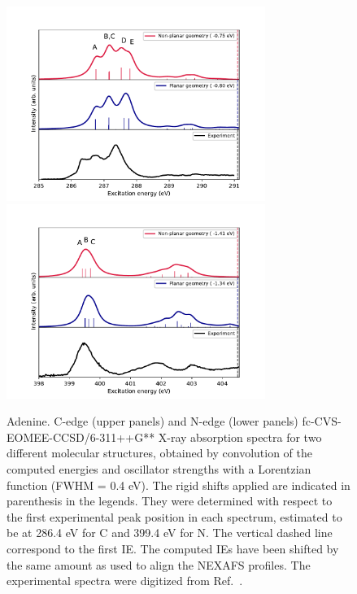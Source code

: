 \documentclass[journal=jctcce,manuscript=article]{achemso}
\begin{document}
\begin{figure}[H]
\includegraphics[width=0.75\textwidth]{Spectra/Adenine_C.pdf}
\includegraphics[width=0.75\textwidth]{Spectra/Adenine_N.pdf}
\caption{Adenine. C-edge (upper panels) and N-edge (lower panels) 
fc-CVS-EOMEE-CCSD/6-311++G** X-ray absorption spectra for two different molecular structures, obtained by convolution of the computed energies and oscillator strengths with a Lorentzian function (FWHM = 0.4 eV). The rigid shifts applied are indicated in parenthesis in the legends. They were determined with respect to the first experimental peak position in each spectrum, estimated to be at 286.4 eV for C and 399.4 eV for N.
The vertical dashed line correspond to the first IE. 
The computed IEs have been shifted by the same amount as used to align the NEXAFS profiles.
The experimental spectra were digitized from Ref.~.
\label{fgr:Adenine}}
\end{figure}
\end{document}

